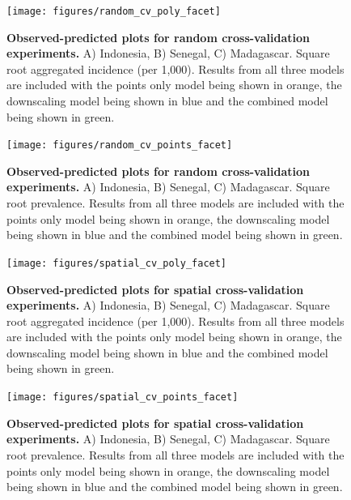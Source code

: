\documentclass[10pt,letterpaper]{article}
\begin{document}
\begin{figure}
\texttt{[image: figures/random\_cv\_poly\_facet]} %
\caption{{\bf Observed-predicted plots for random cross-validation experiments.}
A) Indonesia, B) Senegal, C) Madagascar. Square root aggregated incidence (per 1,000).
Results from all three models are included with the points only model being shown in orange, the downscaling model being shown in blue and the combined model being shown in green.
}
\label{randompredobspolyfacet}
\end{figure}

\begin{figure}
\texttt{[image: figures/random\_cv\_points\_facet]} %
\caption{{\bf Observed-predicted plots for random cross-validation experiments.}
A) Indonesia, B) Senegal, C) Madagascar. Square root prevalence.
Results from all three models are included with the points only model being shown in orange, the downscaling model being shown in blue and the combined model being shown in green.
}
\label{randompredobspointfacet}
\end{figure}



\begin{figure}
\texttt{[image: figures/spatial\_cv\_poly\_facet]} %
\caption{{\bf Observed-predicted plots for spatial cross-validation experiments.}
A) Indonesia, B) Senegal, C) Madagascar. Square root aggregated incidence (per 1,000).
Results from all three models are included with the points only model being shown in orange, the downscaling model being shown in blue and the combined model being shown in green.
}
\label{spatialpredobspolyfacet}
\end{figure}

\begin{figure}
\texttt{[image: figures/spatial\_cv\_points\_facet]} %
\caption{{\bf Observed-predicted plots for spatial cross-validation experiments.}
A) Indonesia, B) Senegal, C) Madagascar. Square root prevalence.
Results from all three models are included with the points only model being shown in orange, the downscaling model being shown in blue and the combined model being shown in green.
}
\label{spatialpredobspointfacet}
\end{figure}
\end{document}
